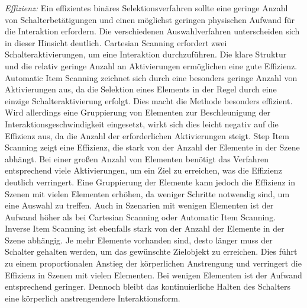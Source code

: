 \textit{Effizienz:}
Ein effizientes binäres Selektionsverfahren sollte eine geringe Anzahl von Schalterbetätigungen und einen möglichst geringen physischen Aufwand für die Interaktion erfordern. Die verschiedenen Auswahlverfahren unterscheiden sich in dieser Hinsicht deutlich. Cartesian Scanning erfordert zwei Schalteraktivierungen, um eine Interaktion durchzuführen. Die klare Struktur und die relativ geringe Anzahl an Aktivierungen ermöglichen eine gute Effizienz. Automatic Item Scanning zeichnet sich durch eine besonders geringe Anzahl von Aktivierungen aus, da die Selektion eines Elements in der Regel durch eine einzige Schalteraktivierung erfolgt. Dies macht die Methode besonders effizient. Wird allerdings eine Gruppierung von Elementen zur Beschleunigung der Interaktionsgeschwindigkeit eingesetzt, wirkt sich dies leicht negativ auf die Effizienz aus, da die Anzahl der erforderlichen Aktivierungen steigt. Step Item Scanning zeigt eine Effizienz, die stark von der Anzahl der Elemente in der Szene abhängt. Bei einer großen Anzahl von Elementen benötigt das Verfahren entsprechend viele Aktivierungen, um ein Ziel zu erreichen, was die Effizienz deutlich verringert. Eine Gruppierung der Elemente kann jedoch die Effizienz in Szenen mit vielen Elementen erhöhen, da weniger Schritte notwendig sind, um eine Auswahl zu treffen. Auch in Szenarien mit wenigen Elementen ist der Aufwand höher als bei Cartesian Scanning oder Automatic Item Scanning. Inverse Item Scanning ist ebenfalls stark von der Anzahl der Elemente in der Szene abhängig. Je mehr Elemente vorhanden sind, desto länger muss der Schalter gehalten werden, um das gewünschte Zielobjekt zu erreichen. Dies führt zu einem proportionalen Anstieg der körperlichen Anstrengung und verringert die Effizienz in Szenen mit vielen Elementen. Bei wenigen Elementen ist der Aufwand entsprechend geringer. Dennoch bleibt das kontinuierliche Halten des Schalters eine körperlich anstrengendere Interaktionsform. 

